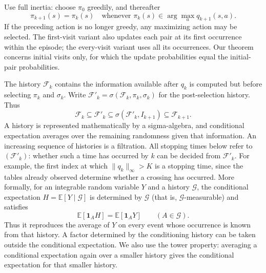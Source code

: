 Use full inertia: choose $\pi_0$ greedily, and thereafter
\begin{equation}\label{eq:greedy-pol-tie-breaking}
\pi_{k+1}(s)=\pi_k(s)\quad\text{whenever }\pi_k(s)\in\arg\max_a q_{k+1}(s,a).
\end{equation}
If the preceding action is no longer greedy, any maximizing action may be selected.
The first-visit variant also updates each pair at its first occurrence within the episode; the every-visit variant uses all its occurrences. Our theorem concerns initial visits only, for which the update probabilities equal the initial-pair probabilities.


The history $\mathcal F_k$ contains the information available after $q_k$ is computed but before selecting $\pi_k$ and $\sigma_k$. Write $\mathcal F'_k=\sigma(\mathcal F_k,\pi_k,\sigma_k)$ for the post-selection history. Thus
\[
\mathcal F_k\subseteq\mathcal F'_k\subseteq\sigma(\mathcal F'_k,I_{k+1})\subseteq\mathcal F_{k+1}.
\]
A history is represented mathematically by a sigma-algebra, and conditional expectation averages over the remaining randomness given that information. An increasing sequence of histories is a filtration. All stopping times below refer to $(\mathcal F'_k)$: whether such a time has occurred by $k$ can be decided from $\mathcal F'_k$. For example, the first index at which $\|q_k\|_\infty>K$ is a stopping time, since the tables already observed determine whether a crossing has occurred. More formally, for an integrable random variable $Y$ and a history $\mathcal G$, the conditional expectation $H=\mathbb E[Y\mid\mathcal G]$ is determined by $\mathcal G$ (that is, $\mathcal G$-measurable) and satisfies
\[
\mathbb E[\mathbf1_AH]=\mathbb E[\mathbf1_AY]\qquad(A\in\mathcal G).
\]
Thus it reproduces the average of $Y$ on every event whose occurrence is known from that history. A factor determined by the conditioning history can be taken outside the conditional expectation. We also use the tower property: averaging a conditional expectation again over a smaller history gives the conditional expectation for that smaller history.

